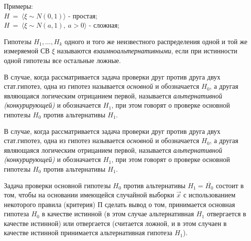 Примеры:\\
$H \ = \ \langle\xi\sim N(0,1)\rangle$ - простая;\\
$H \ = \ \langle\xi\sim N(a,1), \ a > 0 \rangle$ - сложная;\\

\begin{defs}[Взаимноальтернативаность]
    Гипотезы $H_1,\ldots,H_k$ одного и того же неизвестного распределения
    одной и той же измеряемой СВ $\xi$ называются \textit{взаимноальтернативными},
    если при истинности одной гипотезы все остальные ложные.
\end{defs}

\begin{defs}
    В случае, когда рассматривается задача проверки друг против друга двух стат.гипотез,
    одна из гипотез называется \textit{основной} и обозначается $H_0$, а другая являющаяся
    логическим отрицанием первой, называется \textit{альтернативной (конкурирующей)} и
    обозначается $H_1$, при этом говорят о проверке основной гипотезы $H_0$ против
    альтернативы $H_1$.
\end{defs}

\begin{defs}
    В случае, когда рассматривается задача проверки друг против друга двух стат.гипотез,
    одна из гипотез называется \textit{основной} и обозначается $H_0$, а другая являющаяся
    логическим отрицанием первой, называется \textit{альтернативной (конкурирующей)} и
    обозначается $H_1$, при этом говорят о проверке основной гипотезы $H_0$ против
    альтернативы $H_1$.
\end{defs}

\begin{defs}[Выводы]
    Задача проверки основной гипотезы $H_0$ против альтернативы $H_1=\overline{H_0}$
    состоит в том, чтобы на основании имеющейся случайной выборки $\overrightarrow{x}$
    с использованием некоторого правила (критерия) П сделать вывод о том, принимается основная
    гипотеза $H_0$ в качестве истинной (в этом случае альтернативная $H_1$ отвергается
    в качестве истинной) или отвергается (считается ложной, и в этом случаен в качестве истинной принимается
    альтернативная гипотеза $H_1$).
\end{defs}

